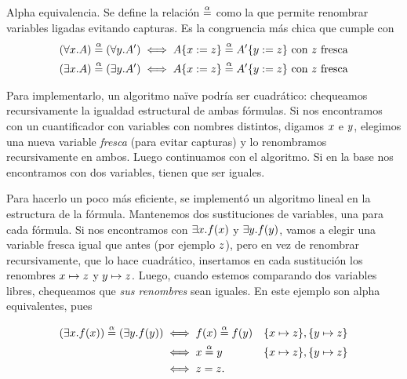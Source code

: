 \begin{definition}{Alpha equivalencia}. Se define la relación $\overset{\alpha}{=}$ como la que permite renombrar variables ligadas evitando capturas. Es la congruencia más chica que cumple con
\begin{align*}
    (\forall x . A) \overset{\alpha}{=} (\forall y . A')
        &\iff
        A \{x := z\} \overset{\alpha}{=}
        A' \{y := z\} \text{ con $z$ fresca}
        \\
    (\exists x . A) \overset{\alpha}{=} (\exists y . A')
        &\iff
        A \{x := z\} \overset{\alpha}{=}
        A' \{y := z\} \text{ con $z$ fresca}
        \\
\end{align*}

\end{definition}

Para implementarlo, un algoritmo naïve podría ser cuadrático: chequeamos recursivamente la igualdad estructural de ambas fórmulas. Si nos encontramos con un cuantificador con variables con nombres distintos, digamos $x$ e $y$, elegimos una nueva variable \textit{fresca} (para evitar capturas) y lo renombramos recursivamente en ambos. Luego continuamos con el algoritmo. Si en la base nos encontramos con dos variables, tienen que ser iguales.

Para hacerlo un poco más eficiente, se implementó un algoritmo lineal en la estructura de la fórmula. Mantenemos dos sustituciones de variables, una para cada fórmula. Si nos encontramos con $\exists x . f(x)$ y $\exists y . f(y)$, vamos a elegir una variable fresca igual que antes (por ejemplo $z$), pero en vez de renombrar recursivamente, que lo hace cuadrático, insertamos en cada sustitución los renombres $x \mapsto z$ y $y \mapsto z$. Luego, cuando estemos comparando dos variables libres, chequeamos que \textit{sus renombres} sean iguales. En este ejemplo son alpha equivalentes, pues

\begin{align*}
    (\exists x . f(x)) \overset{\alpha}{=} (\exists y . f(y))
    &\iff f(x) \overset{\alpha}{=} f(y)
        &&\{x \mapsto z\}, \{y \mapsto z\}\\
    &\iff x \overset{\alpha}{=} y
        &&\{x \mapsto z\}, \{y \mapsto z\}\\
    &\iff z = z.
\end{align*}

